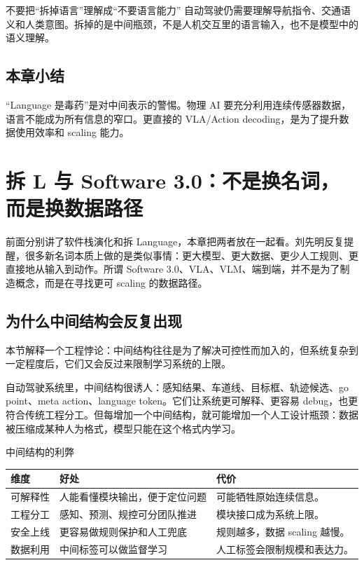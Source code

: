 \documentclass[a4paper]{article}
\begin{document}
\begin{warningbox}{不要把“拆掉语言”理解成“不要语言能力”}
自动驾驶仍需要理解导航指令、交通语义和人类意图。拆掉的是中间瓶颈，不是人机交互里的语言输入，也不是模型中的语义理解。
\end{warningbox}

\subsection{本章小结}

“Language 是毒药”是对中间表示的警惕。物理 AI 要充分利用连续传感器数据，语言不能成为所有信息的窄口。更直接的 VLA/Action decoding，是为了提升数据使用效率和 scaling 能力。

\section{拆 L 与 Software 3.0：不是换名词，而是换数据路径}

前面分别讲了软件栈演化和拆 Language，本章把两者放在一起看。刘先明反复提醒，很多新名词本质上做的是类似事情：更大模型、更大数据、更少人工规则、更直接地从输入到动作。所谓 Software 3.0、VLA、VLM、端到端，并不是为了制造概念，而是在寻找更可 scaling 的数据路径。

\subsection{为什么中间结构会反复出现}

本节解释一个工程悖论：中间结构往往是为了解决可控性而加入的，但系统复杂到一定程度后，它们又会反过来限制学习系统的上限。

自动驾驶系统里，中间结构很诱人：感知结果、车道线、目标框、轨迹候选、go point、meta action、language token。它们让系统更可解释、更容易 debug，也更符合传统工程分工。但每增加一个中间结构，就可能增加一个人工设计瓶颈：数据被压缩成某种人为格式，模型只能在这个格式内学习。

\begin{knowledgebox}{中间结构的利弊}
\begin{tabularx}{\textwidth}{p{}p{}X}
\toprule
维度 & 好处 & 代价 \\
\midrule
可解释性 & 人能看懂模块输出，便于定位问题 & 可能牺牲原始连续信息。 \\
工程分工 & 感知、预测、规控可分团队推进 & 模块接口成为系统上限。 \\
安全上线 & 更容易做规则保护和人工兜底 & 规则越多，数据 scaling 越慢。 \\
数据利用 & 中间标签可以做监督学习 & 人工标签会限制规模和表达力。 \\
\bottomrule
\end{tabularx}
\end{knowledgebox}
\end{document}
